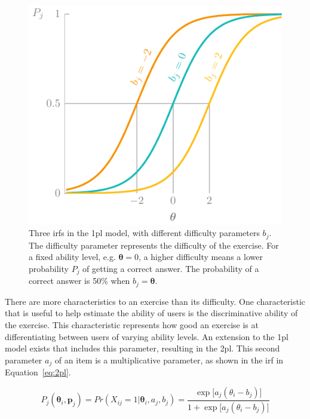 \begin{figure}
    \centering
    \includegraphics[page=1]{03-education/figures/tikzfigures.pdf}
    \caption[Item response functions of the 1PL model]{Three \glspl{irf} in the \gls{1pl} model, with different difficulty parameters $b_j$. The difficulty parameter represents the difficulty of the exercise. 
    For a fixed ability level, e.g. $\bm\theta = 0$, a higher difficulty means a lower probability $P_j$ of getting a correct answer.
    The probability of a correct answer is 50\% when $b_j = \bm\theta$.}
    \label{fig:1pl}
\end{figure}

There are more characteristics to an exercise than its difficulty. 
One characteristic that is useful to help estimate the ability of users is the discriminative ability of the exercise.
This characteristic represents how good an exercise is at differentiating between users of varying ability levels.
An extension to the \gls{1pl} model exists that includes this parameter, resulting in the \gls{2pl}. 
This second parameter $a_j$ of an item is a multiplicative parameter, as shown in the \gls{irf} in Equation~\ref{eq:2pl}.

\begin{equation}
    \label{eq:2pl}
    P_{j}(\bm{\theta}_i,\bm{p}_j) =
    Pr(X_{ij} = 1 | \bm{\theta}_i,a_j,b_j) =
    \frac{\exp\big[a_j(\theta_i - b_j)\big]}{1 + \exp\big[a_j(\theta_i - b_j)\big]}
\end{equation}

